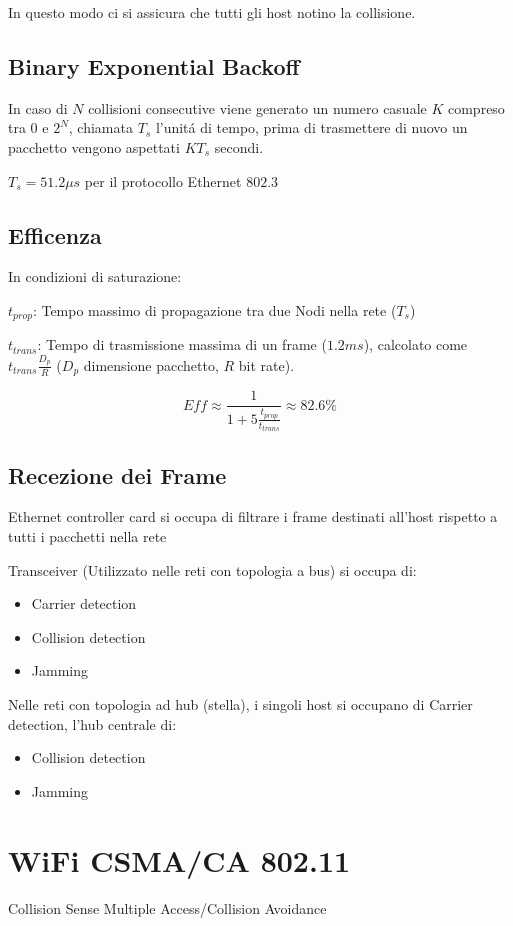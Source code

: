 \documentclass{article}
\begin{document}
In questo modo ci si assicura che tutti gli host notino la collisione.

\subsection{Binary Exponential Backoff}
In caso di $N$ collisioni consecutive viene generato un numero casuale $K$ compreso tra $0$ e $2^N$, chiamata $T_s$ l'unit\'a di tempo, prima di trasmettere di nuovo un pacchetto vengono aspettati $K T_s$ secondi.

$T_s = 51.2\mu s$ per il protocollo Ethernet $802.3$

\subsection{Efficenza}
In condizioni di saturazione:

$t_{prop}$: Tempo massimo di propagazione tra due Nodi nella rete ($T_s$)

$t_{trans}$: Tempo di trasmissione massima di un frame ($1.2 ms$), calcolato come $t_{trans}\frac{D_p}{R}$ ($D_p$ dimensione pacchetto, $R$ bit rate).

\[Eff \approx \frac{1}{1 + 5\frac{t_{prop}}{t_{trans}}} \approx 82.6\%\]

\subsection{Recezione dei Frame}
Ethernet controller card si occupa di filtrare i frame destinati all'host rispetto a tutti i pacchetti nella rete

Transceiver (Utilizzato nelle reti con topologia a bus) si occupa di:
\begin{itemize}
    \item Carrier detection
    \item Collision detection
    \item Jamming
\end{itemize}

Nelle reti con topologia ad hub (stella), i singoli host si occupano di Carrier detection, l'hub centrale di:
\begin{itemize}
    \item Collision detection
    \item Jamming
\end{itemize}

\section{WiFi CSMA/CA 802.11}
Collision Sense Multiple Access/Collision Avoidance
\end{document}
